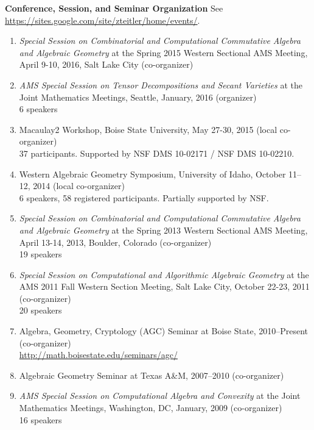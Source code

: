\documentclass[12pt]{article}
\begin{document}
\textbf{Conference, Session, and Seminar Organization}
See \url{https://sites.google.com/site/zteitler/home/events/}.
\begin{enumerate}
\item \textit{Special Session on Combinatorial and Computational
Commutative Algebra and Algebraic Geometry}
at the Spring 2015 Western Sectional AMS Meeting,
April 9-10, 2016, Salt Lake City (co-organizer)


\item \textit{AMS Special Session on Tensor Decompositions and Secant Varieties}
at the Joint Mathematics Meetings, Seattle, January, 2016 (organizer) \\
6 speakers

\item Macaulay2 Workshop, Boise State University, May 27-30, 2015 (local co-organizer) \\
37 participants. Supported by NSF DMS 10-02171 / NSF DMS 10-02210.

\item Western Algebraic Geometry Symposium, University of Idaho, October 11--12, 2014 (local co-organizer) \\
6 speakers, 58 registered participants. Partially supported by NSF.

\item \textit{Special Session on Combinatorial and Computational
Commutative Algebra and Algebraic Geometry}
at the Spring 2013 Western Sectional AMS Meeting,
April 13-14, 2013, Boulder, Colorado (co-organizer) \\
19 speakers

\item \textit{Special Session on Computational and Algorithmic Algebraic Geometry}
at the AMS 2011 Fall Western Section Meeting, Salt Lake City, October 22-23, 2011 (co-organizer) \\
20 speakers

\item Algebra, Geometry, Cryptology (AGC) Seminar at Boise State, 2010--Present (co-organizer) \\
\url{http://math.boisestate.edu/seminars/agc/}

\item Algebraic Geometry Seminar at Texas A\&M, 2007--2010 (co-organizer)

\item \textit{AMS Special Session on Computational Algebra and Convexity}
at the Joint Mathematics Meetings, Washington, DC, January, 2009 (co-organizer) \\
16 speakers


\end{enumerate}
\end{document}
